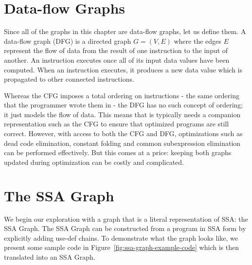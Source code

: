 \section{Data-flow Graphs}
Since all of the graphs in this chapter are data-flow graphs, let us define them. A data-flow graph (DFG) is a directed graph $G=(V,E)$ where the edges $E$ represent the flow of data from the result of one instruction to the input of another. 
An instruction executes once all of its input data values have been computed. When an instruction executes, it produces a new data value which is propagated to other connected instructions.

Whereas the CFG imposes a total ordering on instructions - the same ordering that the programmer wrote them in - the DFG has no such concept of ordering; it just models the flow of data. This means that is typically needs a companion representation such as the CFG to ensure that optimized programs are still correct.
However, with access to both the CFG and DFG, optimizations such as dead code elimination, constant folding and common subexpression elimination can be performed effectively. But this comes at a price: keeping both graphs updated during optimization can be costly and complicated. 

\section{The SSA Graph}

We begin our exploration with a graph that is a literal representation of SSA: the SSA Graph. 
The SSA Graph can be constructed from a program in SSA form by explicitly adding use-def chains. 
To demonstrate what the graph looks like, we present some sample code in Figure~\ref{fig:ssa-graph-example-code} which is then translated into an SSA Graph.


